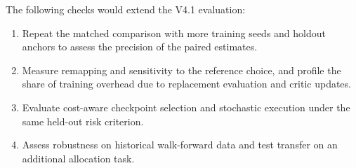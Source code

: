 \documentclass[10pt]{article}
\begin{document}
The following checks would extend the V4.1 evaluation:
\begin{enumerate}
  \item Repeat the matched comparison with more training seeds and holdout anchors to assess the precision of the paired estimates.
  \item Measure remapping and sensitivity to the reference choice, and profile the share of training overhead due to replacement evaluation and critic updates.
  \item Evaluate cost-aware checkpoint selection and stochastic execution under the same held-out risk criterion.
  \item Assess robustness on historical walk-forward data and test transfer on an additional allocation task.
\end{enumerate}
\end{document}
